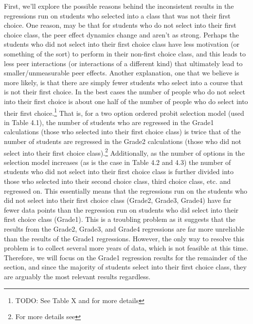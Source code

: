 First, we'll explore the possible reasons behind the inconsistent results in the regressions run on students who selected into a class that was not their first choice. 
One reason, may be that for students who do not select into their first choice class, the peer effect dynamics change and aren't as strong. 
Perhaps the students who did not select into their first choice class have less motivation (or something of the sort) to perform in their non-first choice class, and this leads to less peer interactions (or interactions of a different kind) that ultimately lead to smaller/unmeasurable peer effects. 
Another explanation, one that we believe is more likely, is that there are simply fewer students who select into a course that is not their first choice. 
In the best cases the number of people who do not select into their first choice is about one half of the number of people who do select into their first choice.\footnote{TODO: See Table X and  for more details} 
That is, for a two option ordered probit selection model (used in Table 4.1), the number of students who are regressed in the Grade1 calculations (those who selected into their first choice class) is twice that of the number of students are regressed in the Grade2 calculations (those who did not select into their first choice class).\footnote{For more details see } 
Additionally, as the number of options in the selection model increases (as is the case in Table 4.2 and 4.3) the number of students who did not select into their first choice class is further divided into those who selected into their second choice class, third choice class, etc. and regressed on. 
This essentially means that the regressions run on the students who did not select into their first choice class (Grade2, Grade3, Grade4) have far fewer data points than the regression run on students who did select into their first choice class (Grade1). 
This is a troubling problem as it suggests that the results from the Grade2, Grade3, and Grade4 regressions are far more unreliable than the results of the Grade1 regressions. 
However, the only way to resolve this problem is to collect several more years of data, which is not feasible at this time. 
Therefore, we will focus on the Grade1 regression results for the remainder of the section, and since the majority of students select into their first choice class, they are arguably the most relevant results regardless. 
 
